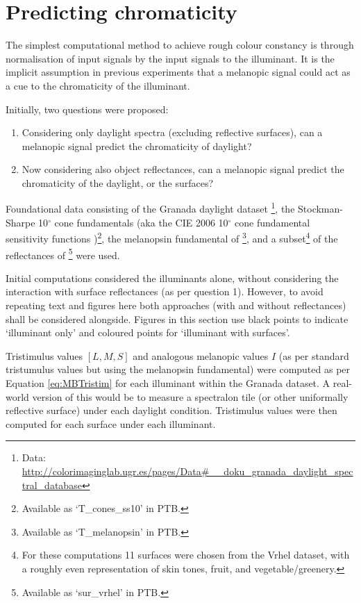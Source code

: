 \section{Predicting chromaticity}

The simplest computational method to achieve rough colour constancy is through normalisation of input signals by the input signals to the illuminant. It is the implicit assumption in previous experiments that a melanopic signal could act as a cue to the chromaticity of the illuminant.


Initially, two questions were proposed:
\begin{enumerate}
\item Considering only daylight spectra (excluding reflective surfaces), can a melanopic signal predict the chromaticity of daylight? 
\item Now considering also object reflectances, can a melanopic signal predict the chromaticity of the daylight, or the surfaces? 
\end{enumerate}

Foundational data consisting of 
the Granada daylight dataset 
\citep{hernandez-andres_color_2001}\footnote{Data: \url{http://colorimaginglab.ugr.es/pages/Data\#__doku_granada_daylight_spectral_database}},
the Stockman-Sharpe 10$^{\circ}$ cone fundamentals 
\citep{stockman_spectral_2000,stockman_spectral_1999}
(aka the CIE 2006 10$^{\circ}$ cone fundamental sensitivity functions \cite{cie_cie_2006})\footnote{Available as `T\_cones\_ss10' in \gls{PTB}.},
the melanopsin fundamental of \citet{lucas_measuring_2014}\footnote{Available as `T\_melanopsin' in \gls{PTB}.},
and a subset\footnote{For these computations 11 surfaces were chosen from the Vrhel dataset, with a roughly even representation of skin tones, fruit, and vegetable/greenery.} 
of the reflectances of \citet{vrhel_measurement_1994}\footnote{Available as `sur\_vrhel' in \gls{PTB}.}
were used.

Initial computations considered the illuminants alone, without considering the interaction with surface reflectances (as per question 1). However, to avoid repeating text and figures here both approaches (with and without reflectances) shall be considered alongside. Figures in this section use black points to indicate `illuminant only' and coloured points for `illuminant with surfaces'. 

Tristimulus values $[L,M,S]$ and analogous melanopic values $I$ (as per standard tristumulus values but using the melanopsin fundamental) were computed as per Equation \ref{eq:MBTristim} for each illuminant within the Granada dataset. A real-world version of this would be to measure a spectralon tile (or other uniformally reflective surface) under each daylight condition. Tristimulus values were then computed for each surface under each illuminant.

